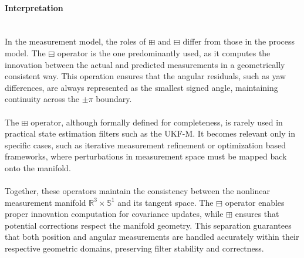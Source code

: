 \paragraph{Interpretation} \mbox{}\\[0.5em] \noindent
In the measurement model, the roles of $\boxplus$ and $\boxminus$ differ from those in the process model. The $\boxminus$ operator is the one predominantly used, as it computes the innovation between the actual and predicted measurements in a geometrically consistent way. This operation ensures that the angular residuals, such as yaw differences, are always represented as the smallest signed angle, maintaining continuity across the $\pm\pi$ boundary.  
\\ \\
The $\boxplus$ operator, although formally defined for completeness, is rarely used in practical state estimation filters such as the UKF-M. It becomes relevant only in specific cases, such as iterative measurement refinement or optimization based frameworks, where perturbations in measurement space must be mapped back onto the manifold.  
\\ \\
Together, these operators maintain the consistency between the nonlinear measurement manifold $\mathbb{R}^3 \times \mathbb{S}^1$ and its tangent space. The $\boxminus$ operator enables proper innovation computation for covariance updates, while $\boxplus$ ensures that potential corrections respect the manifold geometry. This separation guarantees that both position and angular measurements are handled accurately within their respective geometric domains, preserving filter stability and correctness.



